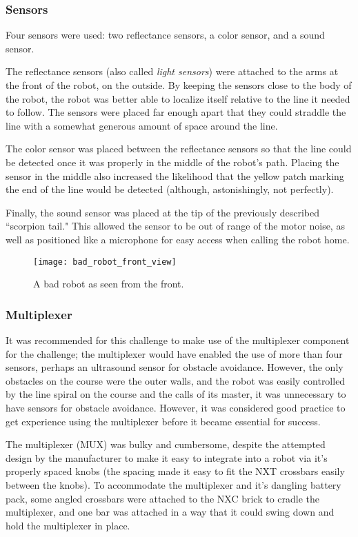 \documentclass{article}
\begin{document}
\subsubsection{Sensors}
Four sensors were used: two reflectance sensors, a color sensor, and a sound sensor.

The reflectance sensors (also called \textit{light sensors}) were attached to the arms at the front of the robot, on the outside. By keeping the sensors close to the body of the robot, the robot was better able to localize itself relative to the line it needed to follow. The sensors were placed far enough apart that they could straddle the line with a somewhat generous amount of space around the line.

The color sensor was placed between the reflectance sensors so that the line could be detected once it was properly in the middle of the robot's path. Placing the sensor in the middle also increased the likelihood that the yellow patch marking the end of the line would be detected (although, astonishingly, not perfectly).

Finally, the sound sensor was placed at the tip of the previously described ``scorpion tail." This allowed the sensor to be out of range of the motor noise, as well as positioned like a microphone for easy access when calling the robot home.


    \begin{figure}[h]
    \centering
    \texttt{[image: bad\_robot\_front\_view]}
    \caption{A bad robot as seen from the front.}
    \label{fig:bad_robot_front_view}
    \end{figure}

\subsubsection{Multiplexer}
It was recommended for this challenge to make use of the multiplexer component for the challenge; the multiplexer would have enabled the use of more than four sensors, perhaps an ultrasound sensor for obstacle avoidance. However, the only obstacles on the course were the outer walls, and the robot was easily controlled by the line spiral on the course and the calls of its master, it was unnecessary to have sensors for obstacle avoidance. However, it was considered good practice to get experience using the multiplexer before it became essential for success.

The multiplexer (MUX) was bulky and cumbersome, despite the attempted design by the manufacturer to make it easy to integrate into a robot via it's properly spaced knobs (the spacing made it easy to fit the NXT crossbars easily between the knobs). To accommodate the multiplexer and it's dangling battery pack, some angled crossbars were attached to the NXC brick to cradle the multiplexer, and one bar was attached in a way that it could swing down and hold the multiplexer in place.
\end{document}
